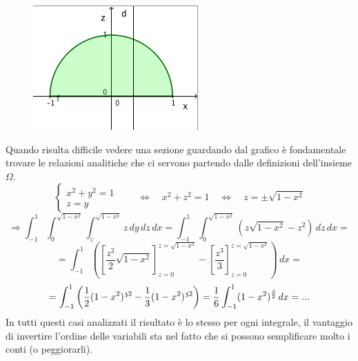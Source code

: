 \documentclass[10pt]{article}
\theoremstyle{plain}
\theoremstyle{definition}
\begin{document}
\begin{figure}[ht]
\centering
\centerline{\includegraphics[width=85 mm,scale=1]{latex_img4.png}}
\label{fig: }
\end{figure}


Quando risulta difficile vedere una sezione guardando dal grafico è fondamentale trovare le relazioni analitiche che ci servono partendo dalle definizioni dell'insieme $\Omega$.
$$\begin{cases}
x^2+y^2=1 \\ z=y
\end{cases} 
\qquad \Leftrightarrow \quad x^2+z^2=1 \quad \Leftrightarrow \quad z=\pm \sqrt{1-x^2}$$
$$\Rightarrow \int_{-1}^{1} \int_{0}^{\sqrt{1-x^2}} \int_{z}^{\sqrt{1-x^2}}z \,dy \,dz \,dx = \int_{-1}^{1} \int_{0}^{\sqrt{1-x^2}} (z\sqrt{1-x^2} - z^2) \,dz \,dx =  $$
$$=\int_{-1}^{1} \left(\left[ \frac{z^2}{2} \sqrt{1-x^2} \right]_{z=0}^{z=\sqrt{1-x^2}} -\left[ \frac{z^3}{3} \right]_{z=0}^{z=\sqrt{1-x^2}}\right)\,dx = $$
$$= \int_{-1}^{1} \left( \frac{1}{2}(1-x^2)^{\frak{3}{2}} - \frac{1}{3}(1-x^2)^{\frak{3}{2}} \right)= \frac{1}{6} \int_{-1}^{1}(1-x^2)^{\frac{3}{2}} \,dx = ...$$
In tutti questi casi analizzati il risultato è lo stesso per ogni integrale, il vantaggio di invertire l'ordine delle variabili sta nel fatto che si possono semplificare molto i conti (o peggiorarli).
\end{document}
